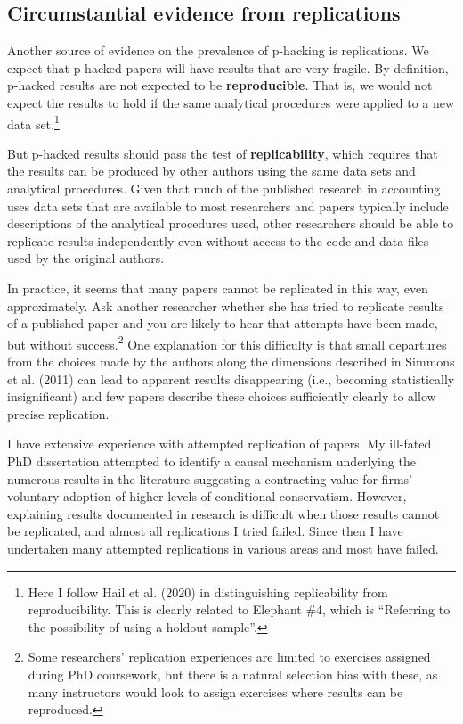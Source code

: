 \documentclass[
  letterpaper,
  DIV=11,
  numbers=noendperiod]{scrartcl}
\begin{document}
\hypertarget{circumstantial-evidence-from-replications}{%
\subsection{Circumstantial evidence from
replications}\label{circumstantial-evidence-from-replications}}

Another source of evidence on the prevalence of p-hacking is
replications. We expect that p-hacked papers will have results that are
very fragile. By definition, p-hacked results are not expected to be
\textbf{reproducible}. That is, we would not expect the results to hold
if the same analytical procedures were applied to a new data
set.\footnote{Here I follow Hail et al. (2020) in distinguishing
  replicability from reproducibility. This is clearly related to
  Elephant \#4, which is ``Referring to the possibility of using a
  holdout sample''.}

But p-hacked results should pass the test of \textbf{replicability},
which requires that the results can be produced by other authors using
the same data sets and analytical procedures. Given that much of the
published research in accounting uses data sets that are available to
most researchers and papers typically include descriptions of the
analytical procedures used, other researchers should be able to
replicate results independently even without access to the code and data
files used by the original authors.

In practice, it seems that many papers cannot be replicated in this way,
even approximately. Ask another researcher whether she has tried to
replicate results of a published paper and you are likely to hear that
attempts have been made, but without success.\footnote{Some researchers'
  replication experiences are limited to exercises assigned during PhD
  coursework, but there is a natural selection bias with these, as many
  instructors would look to assign exercises where results can be
  reproduced.} One explanation for this difficulty is that small
departures from the choices made by the authors along the dimensions
described in Simmons et al. (2011) can lead to apparent results
disappearing (i.e., becoming statistically insignificant) and few papers
describe these choices sufficiently clearly to allow precise
replication.

I have extensive experience with attempted replication of papers. My
ill-fated PhD dissertation attempted to identify a causal mechanism
underlying the numerous results in the literature suggesting a
contracting value for firms' voluntary adoption of higher levels of
conditional conservatism. However, explaining results documented in
research is difficult when those results cannot be replicated, and
almost all replications I tried failed. Since then I have undertaken
many attempted replications in various areas and most have failed.
\end{document}
